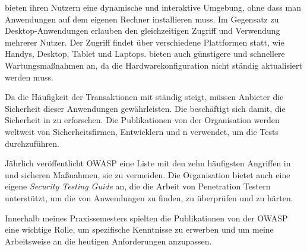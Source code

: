  bieten ihren Nutzern eine dynamische und interaktive Umgebung, ohne dass man Anwendungen auf dem eigenen Rechner installieren muss. Im Gegensatz zu Desktop-Anwendungen erlauben  den gleichzeitigen Zugriff und Verwendung mehrerer Nutzer. Der Zugriff findet über verschiedene Plattformen statt, wie Handys, Desktop, Tablet und Laptops.  bieten auch günstigere und schnellere Wartungsmaßnahmen an, da die Hardwarekonfiguration nicht ständig aktualisiert werden muss\citep{webapp}. 

Da die Häufigkeit der Transaktionen mit  ständig steigt, müssen Anbieter die Sicherheit dieser Anwendungen gewährleisten. Die  beschäftigt sich damit, die Sicherheit in  zu erforschen. Die Publikationen von der Organisation werden weltweit von Sicherheitsfirmen, Entwicklern und n verwendet, um die Tests durchzuführen. 

Jährlich veröffentlicht \gls{OWASP} eine Liste mit den zehn häufigsten Angriffen in  und sicheren Maßnahmen, sie zu vermeiden. Die Organisation bietet auch eine eigene \textit{Security Testing Guide} an, die die Arbeit von Penetration Testern unterstützt, um die  von Anwendungen zu finden, zu überprüfen und zu härten.

Innerhalb meines Praxissemesters spielten die Publikationen von der \gls{OWASP} eine wichtige Rolle, um spezifische Kenntnisse zu erwerben und um meine Arbeitsweise an die heutigen Anforderungen anzupassen. 